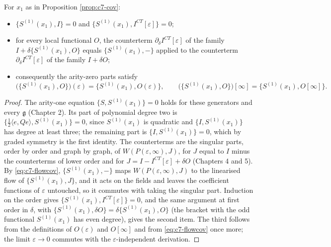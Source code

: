 \begin{corollary}
\label{cor:c7-equiv}
For $x_1$ as in Proposition \ref{prop:c7-cov}:
\begin{itemize}
\item $\{S^{(1)}(x_1),I\}=0$ and $\{S^{(1)}(x_1),I^{CT}[\varepsilon]\}=0$;
\item for every local functional $O$, the counterterm $\partial_\delta I^{CT}[\varepsilon]$ of the family $I+\delta\{S^{(1)}(x_1),O\}$ equals $\{S^{(1)}(x_1),-\}$ applied to the counterterm $\partial_\delta I^{CT}[\varepsilon]$ of the family $I+\delta O$;
\item consequently the arity-zero parts satisfy
\[
\big(\{S^{(1)}(x_1),O\}\big)(\varepsilon)=\{S^{(1)}(x_1),O(\varepsilon)\},\qquad \big(\{S^{(1)}(x_1),O\}\big)[\infty]=\{S^{(1)}(x_1),O[\infty]\}.
\]
\end{itemize}
\end{corollary}

\begin{proof}
The arity-one equation $\{S,S^{(1)}(x_1)\}=0$ holds for these generators and every $\mathfrak g$ (Chapter 2). Its part of polynomial degree two is $\{\tfrac12\langle e,Qe\rangle,S^{(1)}(x_1)\}=0$, since $S^{(1)}(x_1)$ is quadratic and $\{I,S^{(1)}(x_1)\}$ has degree at least three; the remaining part is $\{I,S^{(1)}(x_1)\}=0$, which by graded symmetry is the first identity. The counterterms are the singular parts, order by order and graph by graph, of $W(P(\varepsilon,\infty),J)$, for $J$ equal to $I$ minus the counterterms of lower order and for $J=I-I^{CT}[\varepsilon]+\delta O$ (Chapters 4 and 5). By \eqref{eq:c7-flowcov}, $\{S^{(1)}(x_1),-\}$ maps $W(P(\varepsilon,\infty),J)$ to the linearised flow of $\{S^{(1)}(x_1),J\}$, and it acts on the fields and leaves the coefficient functions of $\varepsilon$ untouched, so it commutes with taking the singular part. Induction on the order gives $\{S^{(1)}(x_1),I^{CT}[\varepsilon]\}=0$, and the same argument at first order in $\delta$, with $\{S^{(1)}(x_1),\delta O\}=\delta\{S^{(1)}(x_1),O\}$ (the bracket with the odd functional $S^{(1)}(x_1)$ has even degree), gives the second item. The third follows from the definitions of $O(\varepsilon)$ and $O[\infty]$ and from \eqref{eq:c7-flowcov} once more; the limit $\varepsilon\to0$ commutes with the $\varepsilon$-independent derivation.
\end{proof}

